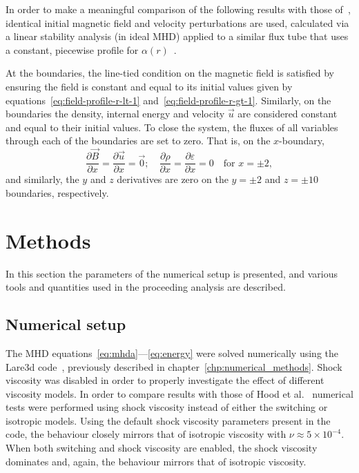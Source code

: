 In order to make a meaningful comparison of the following results with those of~\cite{hoodCoronalHeatingMagnetic2009}, identical initial magnetic field and velocity perturbations are used, calculated via a linear stability analysis (in ideal MHD) applied to a similar flux tube that uses a constant, piecewise profile for $\alpha(r)$~\cite{vanderlindenCompleteCoronalLoop1999,browningSolarCoronalHeating2003c,browningHeatingCoronaNanoflares2008a}.

At the boundaries, the line-tied condition on the magnetic field is satisfied by ensuring the field is constant and equal to its initial values given by equations~\eqref{eq:field-profile-r-lt-1} and~\eqref{eq:field-profile-r-gt-1}. Similarly, on the boundaries the density, internal energy and velocity $\vec{u}$ are considered constant and equal to their initial values. To close the system, the fluxes of all variables through each of the boundaries are set to zero. That is, on the $x$-boundary,
\begin{equation}
  \frac{\partial \vec{B}}{\partial x} = \frac{\partial \vec{u}}{\partial x} = \vec{0}; \quad \frac{\partial \rho}{\partial x} = \frac{\partial \varepsilon}{\partial x} = 0 \quad \text{for } x=\pm 2,
\end{equation}
and similarly, the $y$ and $z$ derivatives are zero on the $y=\pm2$ and $z=\pm10$ boundaries, respectively.

\section{Methods}
\label{sec:general-numerical-setup}

In this section the parameters of the numerical setup is presented, and various tools and quantities used in the proceeding analysis are described.

\subsection{Numerical setup}

The MHD equations~\eqref{eq:mhda}---\eqref{eq:energy} were solved numerically using the Lare3d code~\cite{arberStaggeredGridLagrangian2001}, previously described in chapter~\ref{chp:numerical_methods}. Shock viscosity was disabled in order to properly investigate the effect of different viscosity models. In order to compare results with those of Hood et al.~\cite{hoodCoronalHeatingMagnetic2009} numerical tests were performed using shock viscosity instead of either the switching or isotropic models. Using the default shock viscosity parameters present in the code, the behaviour closely mirrors that of isotropic viscosity with $\nu\approx 5\times10^{-4}$. When both switching and shock viscosity are enabled, the shock viscosity dominates and, again, the behaviour mirrors that of isotropic viscosity.

